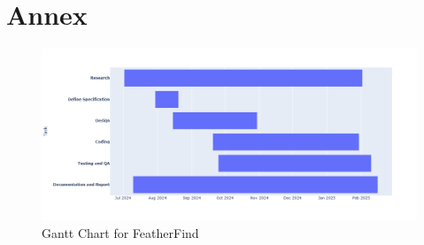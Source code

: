 \renewcommand\bibname{REFERENCES} %


\newpage

\chapter*{Annex}
\begin{figure}[h!]
      \centering
      \includegraphics[scale=0.38]{images/gantt_chart.png}
      \caption{Gantt Chart for FeatherFind}
  \end{figure}


